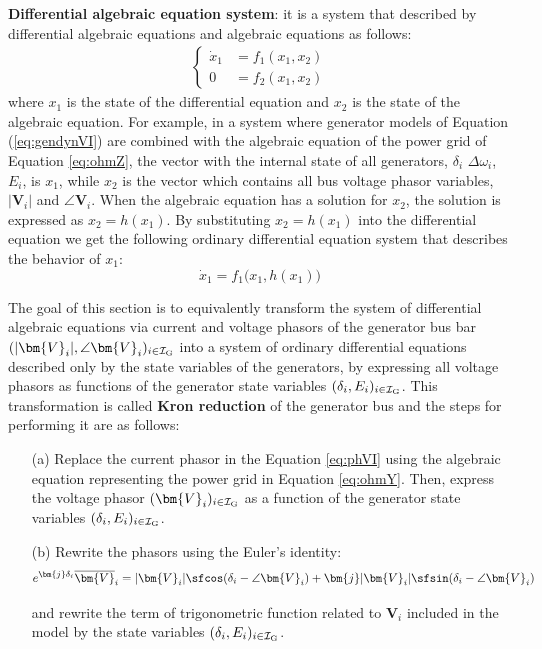 \documentclass[graybox, envcountchap]{svmult}
\begin{document}
\begin{COLUMN}
\noindent \textbf{Differential algebraic equation system}:
it is a system that described by differential algebraic equations and algebraic
equations as follows:
\begin{equation*}
  \begin{aligned}
    \begin{cases}
      \dot{x}_1 &= f_1(x_1,x_2) \\
      0 &= f_2(x_1,x_2)
    \end{cases}
  \end{aligned}
\end{equation*}
where $x_1$ is the state of the differential equation and $x_2$ is the state of
the algebraic equation. For example, in a system where generator models of
Equation (\ref{eq:gendynVI}) are combined with the algebraic equation of the
power grid of Equation \ref{eq:ohmZ}, the vector with the internal state of all
generators, $\delta_i$ $\Delta \omega_i$, $E_i$, is $x_1$, while $x_2$ is the
vector which contains all bus voltage phasor variables, $|\bm{V}_i|$ and $\angle
\bm{V}_i$. When the algebraic equation has a solution for $x_2$, the solution is
expressed as $x_2= h(x_1)$. By substituting $x_2 = h(x_1)$ into the differential
equation we get the following ordinary differential equation system that
describes the behavior of $x_1$:
\[
  \dot{x}_1 = f_1\bigl(x_1,h(x_1) \bigr)
\]
\end{COLUMN}

The goal of this section is to equivalently transform the system of differential
algebraic equations via current and voltage phasors of the generator bus bar
$(|\bm{V}_i|, \angle \bm{V}_i)_{i\in \mathcal{I}_{\rm G}}$ into a system of
ordinary differential equations described only by the state variables of the
generators, by expressing all voltage phasors as functions of the generator
state variables $(\delta_i,E_i)_{i\in \mathcal{I}_{\rm G}}$. This transformation
is called \textbf{Kron reduction} of the generator bus and the steps for
performing it are as follows:

\medskip
\begin{breakbox} 
  \begin{itemize}
    \item[(a)] Replace the current phasor in the Equation \ref{eq:phVI} using the
    algebraic equation representing the power grid in Equation \ref{eq:ohmY}. Then,
    express the voltage phasor $(\bm{V}_i)_{i\in \mathcal{I}_{\rm G}}$ as a function
    of the generator state variables $(\delta_i,E_i)_{i\in \mathcal{I}_{\rm G}}$.

    \item[(b)] Rewrite the phasors using the Euler's identity:
    \[
      e^{\bm{j} \delta_i } \overline{\bm{V}}_i
      = |{\bm{V}_i}| \sfcos (\delta_i -\angle \bm{V}_i )
      +
      \bm{j} |{\bm{V}_i}| \sfsin (\delta_i -\angle \bm{V}_i )
    \]

    and rewrite the term of trigonometric function related to $\bm{V}_i$ included in
    the model by the state variables $(\delta_i,E_i)_{i\in \mathcal{I}_{\rm G}}$.
  \end{itemize}
\end{breakbox}
\medskip
\end{document}
